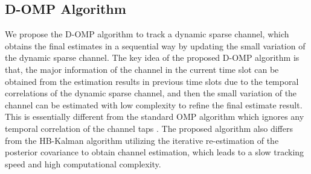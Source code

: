 \documentclass[conference]{IEEEtran}
\begin{document}
\subsection{D-OMP Algorithm}
We propose the D-OMP algorithm to track a dynamic sparse channel, which obtains the final estimates in a sequential way by updating the small variation of the dynamic sparse channel.
The key idea of the proposed D-OMP algorithm is that, the major information of the channel in the current time slot can be obtained from the estimation results in previous time slots due to the temporal correlations of the dynamic sparse channel, and then the small variation of the channel can be estimated with low complexity to refine the final estimate result.
This is essentially different from the standard OMP algorithm which ignores any temporal correlation of the channel taps \cite{StandardOMP}.
The proposed algorithm also differs from the HB-Kalman algorithm utilizing the iterative re-estimation of the posterior covariance to obtain channel estimation, which leads to a slow tracking speed and high computational complexity.
\end{document}
